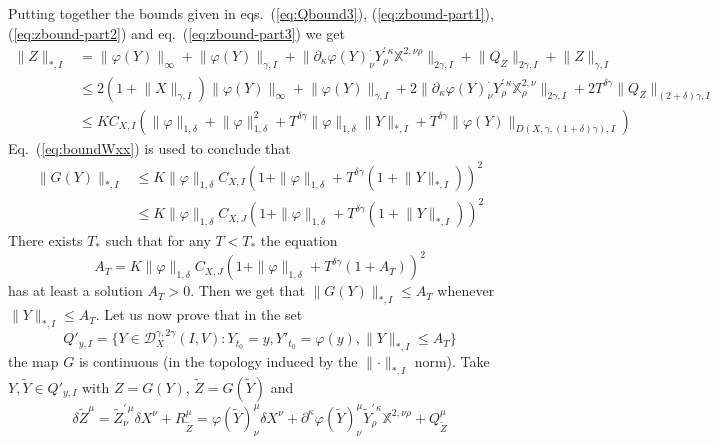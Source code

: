 \documentclass[a4paper,12pt,reqno]{amsproc}
\newcommand{\der}{\delta\!}
\newcommand{\XX}{\mathbb{X}}
\newcommand{\DD}{\mathcal{D}}
\newcommand{\norm}[1]{\lVert #1\rVert}
\newcommand{\wt}{\widetilde}
\begin{document}
Putting together the bounds given in
eqs.~(\ref{eq:Qbound3}), (\ref{eq:zbound-part1}), (\ref{eq:zbound-part2})
and eq.~(\ref{eq:zbound-part3}) we get
\begin{equation}
\label{eq:boundstoghether0}
  \begin{split}
\norm{Z}_{*,I} & = \norm{\varphi(Y)}_\infty +
\norm{\varphi(Y)}_{\gamma,I} + \norm{\partial_\kappa \varphi(Y)^{\cdot}_{\nu}
 Y^{\prime\,\kappa}_{\rho} \XX^{2,\nu\rho}}_{2\gamma,I} +
\norm{Q_Z}_{2\gamma,I} + \norm{Z}_{\gamma,I}
\\ & \le
2 (1+\norm{X}_{\gamma,I}) \norm{\varphi(Y)}_\infty +
\norm{\varphi(Y)}_{\gamma,I} 
 + 2 \norm{\partial_\kappa \varphi(Y)^{\cdot}_{\nu}
 Y^{\prime\,\kappa}_{\rho} \XX^{2,\nu}_{\rho}}_{2\gamma,I} +
 2T^{\delta\gamma} \norm{Q_Z}_{(2+\delta)\gamma,I}
\\ & \le K C_{X,I} (\norm{\varphi}_{1,\delta} + \norm{\varphi}_{1,\delta}^2 
+ T^{\delta\gamma} \norm{\varphi}_{1,\delta}\norm{Y}_{*,I}
+ T^{\delta\gamma}\norm{\varphi(Y)}_{D(X,\gamma,(1+\delta)\gamma),I})
  \end{split}
\end{equation}
Eq.~(\ref{eq:boundWxx}) is used to conclude that
\begin{equation}
\label{eq:bound_on_gy}
  \begin{split}
\norm{G(Y)}_{*,I} & \le K \|\varphi\|_{1,\delta}
C_{X,I}(1+\|\varphi\|_{1,\delta}+T^{\delta\gamma} (1+\norm{Y}_{*,I}))^2 
\\ & \le K \|\varphi\|_{1,\delta} C_{X,J}(1+\|\varphi\|_{1,\delta}+T^{\delta\gamma} (1+\norm{Y}_{*,I}))^2
  \end{split}
\end{equation}
There exists $T_*$ such that for any $T < T_*$
the equation
$$
A_T  = K \|\varphi\|_{1,\delta} C_{X,J}(1+\|\varphi\|_{1,\delta}+T^{\delta\gamma} (1+A_T))^2
$$
has at least a solution $A_T > 0$. Then
we get that $\norm{G(Y)}_{*,I} \le A_T$ whenever
$\norm{Y}_{*,I} \le A_T$. Let us now prove that in the set
$$
Q'_{y,I} = \{ Y \in \DD_X^{\gamma,2\gamma}(I,V) : Y_{t_0}=y, Y'_{t_0}
= \varphi(y),
\norm{Y}_{*,I} \le A_T \} 
$$
the map $G$ is continuous (in the topology induced by the
$\norm{\cdot}_{*,I}$ norm).
Take $Y,\wt Y \in Q'_{y,I}$ with $Z = G(Y)$, $\wt Z = G(\wt Y)$ and
\begin{equation*}
\der \wt Z^\mu = \wt Z^{\prime\,\mu}_\nu \der X^\nu + R_{\wt Z}^\mu =
\varphi(\wt Y)^{\mu}_{\nu} \der X^\nu + 
\partial^\kappa \varphi(\wt Y)^{\mu}_{\nu} \wt
Y^{\prime\,\kappa}_{\rho} \XX^{2,\nu\rho} + Q^\mu_{\wt Z}
\end{equation*}
\end{document}
